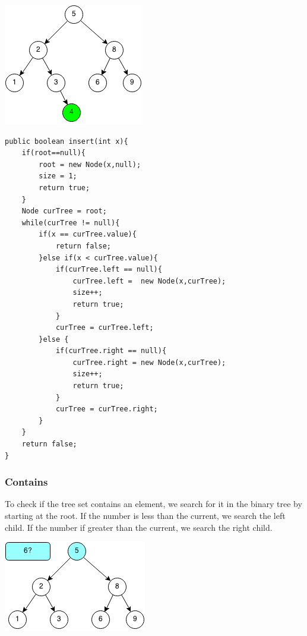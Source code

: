 \documentclass[11pt,oneside]{book}
\makeatletter
\def\maxwidth#1{\ifdim\Gin@nat@width>#1 #1\else\Gin@nat@width\fi}
\makeatother
\begin{document}
\vspace{5px}\includegraphics[width=\maxwidth{\textwidth}]{bstinsert4.png}

\begin{lstlisting}
public boolean insert(int x){
    if(root==null){
        root = new Node(x,null);
        size = 1;
        return true;
    }
    Node curTree = root;
    while(curTree != null){
        if(x == curTree.value){
            return false;
        }else if(x < curTree.value){
            if(curTree.left == null){
                curTree.left =  new Node(x,curTree);
                size++;
                return true;
            }
            curTree = curTree.left;
        }else {
            if(curTree.right == null){
                curTree.right = new Node(x,curTree);
                size++;
                return true;
            }
            curTree = curTree.right;
        }
    }
    return false;
}
\end{lstlisting}

\subsubsection{Contains}

To check if the tree set contains an element, we search for it in the binary tree by starting at the root. If the number is less than the current, we search the left child. If the number if greater than the current, we search the right child.

\vspace{5px}\includegraphics[width=\maxwidth{\textwidth}]{bstcontains.png}
\end{document}
